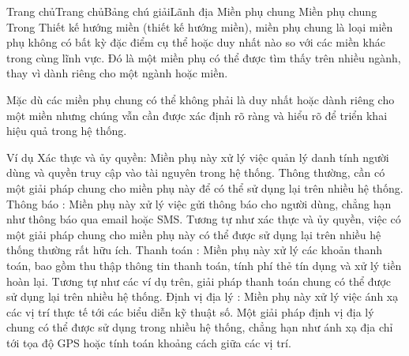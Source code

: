 

Trang chủTrang chủBảng chú giảiLãnh địa Miền phụ chung
Miền phụ chung
Trong Thiết kế hướng miền (thiết kế hướng miền), miền phụ chung là loại miền phụ không có bất kỳ đặc điểm cụ thể hoặc duy nhất nào so với các miền khác trong cùng lĩnh vực. Đó là một miền phụ có thể được tìm thấy trên nhiều ngành, thay vì dành riêng cho một ngành hoặc miền.

Mặc dù các miền phụ chung có thể không phải là duy nhất hoặc dành riêng cho một miền nhưng chúng vẫn cần được xác định rõ ràng và hiểu rõ để triển khai hiệu quả trong hệ thống.

Ví dụ
Xác thực và ủy quyền: Miền phụ này xử lý việc quản lý danh tính người dùng và quyền truy cập vào tài nguyên trong hệ thống. Thông thường, cần có một giải pháp chung cho miền phụ này để có thể sử dụng lại trên nhiều hệ thống.
Thông báo : Miền phụ này xử lý việc gửi thông báo cho người dùng, chẳng hạn như thông báo qua email hoặc SMS. Tương tự như xác thực và ủy quyền, việc có một giải pháp chung cho miền phụ này có thể được sử dụng lại trên nhiều hệ thống thường rất hữu ích.
Thanh toán : Miền phụ này xử lý các khoản thanh toán, bao gồm thu thập thông tin thanh toán, tính phí thẻ tín dụng và xử lý tiền hoàn lại. Tương tự như các ví dụ trên, giải pháp thanh toán chung có thể được sử dụng lại trên nhiều hệ thống.
Định vị địa lý : Miền phụ này xử lý việc ánh xạ các vị trí thực tế tới các biểu diễn kỹ thuật số. Một giải pháp định vị địa lý chung có thể được sử dụng trong nhiều hệ thống, chẳng hạn như ánh xạ địa chỉ tới tọa độ GPS hoặc tính toán khoảng cách giữa các vị trí.



